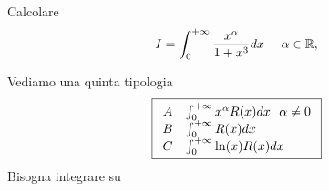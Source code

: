 Calcolare
\begin{equation*}
I = \int ^{ + \infty }_{0}\frac{x^{\alpha }}{1 + x^{3}} dx\ \ \ \ \alpha \in \RR  ,
\end{equation*}
\Esercizio{}

Vediamo una quinta tipologia
\begin{equation*}
\boxed{
\begin{array}{ c l }
A & \int ^{ + \infty }_{0} x^{\alpha } R(x) dx\ \ \alpha \neq 0\\
B & \int ^{ + \infty }_{0} R(x) dx\\
C & \int ^{ + \infty }_{0}\ln(x) R(x) dx
\end{array}}
\end{equation*}
Bisogna integrare su


\begin{figure}[htpb]
	\centering
{} %

\begin{tikzpicture}[x = 0.75pt,y = 0.75pt,yscale = -1,xscale = 1]


\end{tikzpicture}
\end{figure}
